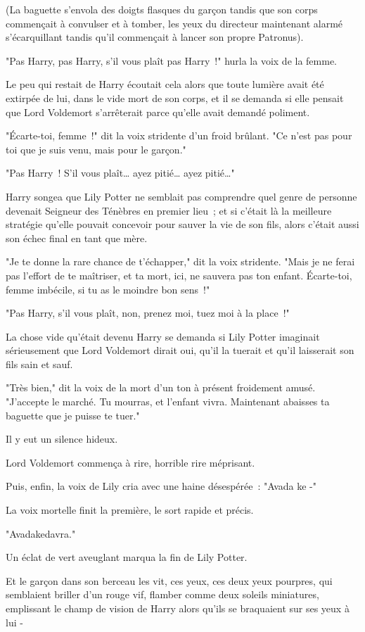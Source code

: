(La baguette s'envola des doigts flasques du garçon tandis que son corps commençait à convulser et à tomber, les yeux du directeur maintenant alarmé s'écarquillant tandis qu'il commençait à lancer son propre Patronus).
\begin{em}

"Pas Harry, pas Harry, s'il vous plaît pas Harry~!" hurla la voix de la femme.

Le peu qui restait de Harry écoutait cela alors que toute lumière avait été extirpée de lui, dans le vide mort de son corps, et il se demanda si elle pensait que Lord Voldemort s'arrêterait parce qu'elle avait demandé poliment.

"Écarte-toi, femme~!" dit la voix stridente d'un froid brûlant. "Ce n'est pas pour toi que je suis venu, mais pour le garçon."

"Pas Harry~! S'il vous plaît… ayez pitié… ayez pitié…"

Harry songea que Lily Potter ne semblait pas comprendre quel genre de personne devenait Seigneur des Ténèbres en premier lieu~; et si c'était là la meilleure stratégie qu'elle pouvait concevoir pour sauver la vie de son fils, alors c'était aussi son échec final en tant que mère.

"Je te donne la rare chance de t'échapper," dit la voix stridente. "Mais je ne ferai pas l'effort de te maîtriser, et ta mort, ici, ne sauvera pas ton enfant. Écarte-toi, femme imbécile, si tu as le moindre bon sens~!"

"Pas Harry, s'il vous plaît, non, prenez moi, tuez moi à la place~!"

La chose vide qu'était devenu Harry se demanda si Lily Potter imaginait sérieusement que Lord Voldemort dirait oui, qu'il la tuerait et qu'il laisserait son fils sain et sauf.

"Très bien," dit la voix de la mort d'un ton à présent froidement amusé. "J'accepte le marché. Tu mourras, et l'enfant vivra. Maintenant abaisses ta baguette que je puisse te tuer."

Il y eut un silence hideux.

Lord Voldemort commença à rire, horrible rire méprisant.

Puis, enfin, la voix de Lily cria avec une haine désespérée~: "Avada ke -"

La voix mortelle finit la première, le sort rapide et précis.

"Avadakedavra."

Un éclat de vert aveuglant marqua la fin de Lily Potter.

Et le garçon dans son berceau les vit, ces yeux, ces deux yeux pourpres, qui semblaient briller d'un rouge vif, flamber comme deux soleils miniatures, emplissant le champ de vision de Harry alors qu'ils se braquaient sur ses yeux à lui -

\end{em}

